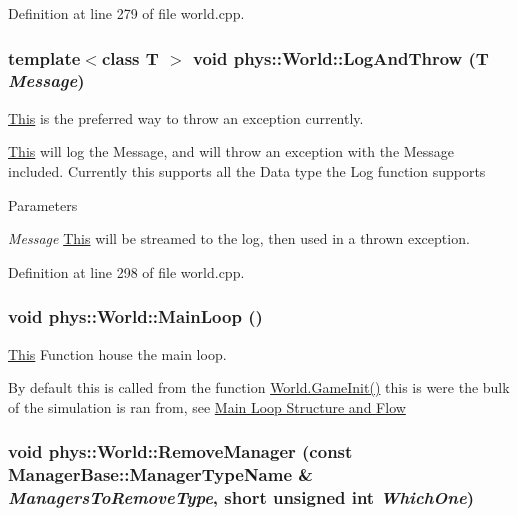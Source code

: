 Definition at line 279 of file world.cpp.

\hypertarget{classphys_1_1World_a88e6bdee6b972111b6804ca746738c50}{
\subsubsection[{LogAndThrow}]{\setlength{\rightskip}{0pt plus 5cm}template$<$class T $>$ void phys::World::LogAndThrow (T {\em Message})}}
\label{da/ddf/classphys_1_1World_a88e6bdee6b972111b6804ca746738c50}


\hyperlink{structThis}{This} is the preferred way to throw an exception currently. 

\hyperlink{structThis}{This} will log the Message, and will throw an exception with the Message included. Currently this supports all the Data type the Log function supports 
\begin{DoxyParams}{Parameters}
\item[{\em Message}]\hyperlink{structThis}{This} will be streamed to the log, then used in a thrown exception. \end{DoxyParams}


Definition at line 298 of file world.cpp.

\hypertarget{classphys_1_1World_af1d9e36d43f5e50543fa2351a32c8362}{
\subsubsection[{MainLoop}]{\setlength{\rightskip}{0pt plus 5cm}void phys::World::MainLoop ()}}
\label{da/ddf/classphys_1_1World_af1d9e36d43f5e50543fa2351a32c8362}


\hyperlink{structThis}{This} Function house the main loop. 

By default this is called from the function \hyperlink{classphys_1_1World_a21cc36be08a61f40619584d4c438936b}{World.GameInit()} this is were the bulk of the simulation is ran from, see \hyperlink{mainloop1}{Main Loop Structure and Flow} \hypertarget{classphys_1_1World_ad885d1102ecdd13cc277ee3f7dfcb742}{
\subsubsection[{RemoveManager}]{\setlength{\rightskip}{0pt plus 5cm}void phys::World::RemoveManager (const {\bf ManagerBase::ManagerTypeName} \& {\em ManagersToRemoveType}, \/  short unsigned int {\em WhichOne})}}
\label{da/ddf/classphys_1_1World_ad885d1102ecdd13cc277ee3f7dfcb742}


